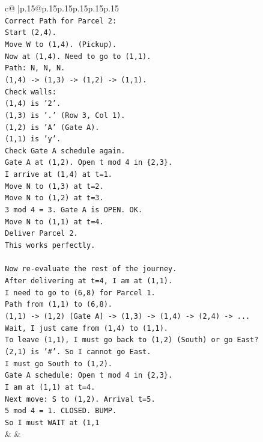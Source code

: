 \documentclass{article}
\begin{document}
{\begin{supertabular}{c@{$\;$}|p{.15\linewidth}@{}p{.15\linewidth}p{.15\linewidth}p{.15\linewidth}p{.15\linewidth}p{.15\linewidth}}
{{{\\ 
\texttt{Correct Path for Parcel 2:} \\
\texttt{Start (2,4).} \\
\texttt{Move W to (1,4). (Pickup).} \\
\texttt{Now at (1,4). Need to go to (1,1).} \\
\texttt{Path: N, N, N.} \\
\texttt{(1,4) {-}> (1,3) {-}> (1,2) {-}> (1,1).} \\
\texttt{Check walls:} \\
\texttt{(1,4) is '2'.} \\
\texttt{(1,3) is '.' (Row 3, Col 1).} \\
\texttt{(1,2) is 'A' (Gate A).} \\
\texttt{(1,1) is 'y'.} \\
\texttt{Check Gate A schedule again.} \\
\texttt{Gate A at (1,2). Open t mod 4 in \{2,3\}.} \\
\texttt{I arrive at (1,4) at t=1.} \\
\texttt{Move N to (1,3) at t=2.} \\
\texttt{Move N to (1,2) at t=3.} \\
\texttt{3 mod 4 = 3. Gate A is OPEN. OK.} \\
\texttt{Move N to (1,1) at t=4.} \\
\texttt{Deliver Parcel 2.} \\
\texttt{This works perfectly.} \\
\\ 
\texttt{Now re{-}evaluate the rest of the journey.} \\
\texttt{After delivering at t=4, I am at (1,1).} \\
\texttt{I need to go to (6,8) for Parcel 1.} \\
\texttt{Path from (1,1) to (6,8).} \\
\texttt{(1,1) {-}> (1,2) {[}Gate A{]} {-}> (1,3) {-}> (1,4) {-}> (2,4) {-}> ...} \\
\texttt{Wait, I just came from (1,4) to (1,1).} \\
\texttt{To leave (1,1), I must go back to (1,2) (South) or go East?} \\
\texttt{(2,1) is '\#'. So I cannot go East.} \\
\texttt{I must go South to (1,2).} \\
\texttt{Gate A schedule: Open t mod 4 in \{2,3\}.} \\
\texttt{I am at (1,1) at t=4.} \\
\texttt{Next move: S to (1,2). Arrival t=5.} \\
\texttt{5 mod 4 = 1. CLOSED. BUMP.} \\
\texttt{So I must WAIT at (1,1} \\
            }
        }
    }
    & & \\ \\


\end{supertabular}}
\end{document}
